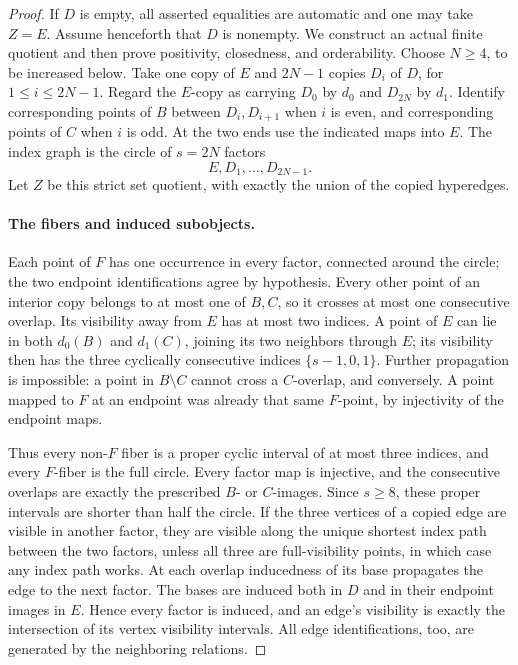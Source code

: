 \begin{proof}
If $D$ is empty, all asserted equalities are automatic and one
may take $Z=E$. Assume henceforth that $D$ is nonempty.
We construct an actual finite quotient and then prove positivity,
closedness, and orderability. Choose $N\geq4$, to be increased
below. Take one copy of $E$ and $2N-1$ copies $D_i$ of $D$,
for $1\leq i\leq2N-1$. Regard the $E$-copy as carrying $D_0$
by $d_0$ and $D_{2N}$ by $d_1$. Identify corresponding points
of $B$ between $D_i,D_{i+1}$ when $i$ is even, and corresponding
points of $C$ when $i$ is odd. At the two ends use the indicated
maps into $E$. The index graph is the circle of $s=2N$ factors
\[
 E,D_1,\ldots,D_{2N-1}.
\]
Let $Z$ be this strict set quotient, with exactly the union of the
copied hyperedges.

\paragraph{The fibers and induced subobjects.}
Each point of $F$ has one occurrence in every factor, connected
around the circle; the two endpoint identifications agree by
hypothesis. Every other point of an interior copy belongs to at
most one of $B,C$, so it crosses at most one consecutive overlap.
Its visibility away from $E$ has at most two indices. A point of
$E$ can lie in both $d_0(B)$ and $d_1(C)$, joining its two
neighbors through $E$; its visibility then has the three cyclically
consecutive indices $\{s-1,0,1\}$. Further propagation is impossible:
a point in $B\setminus C$ cannot cross a $C$-overlap, and conversely.
A point mapped to $F$ at an endpoint was already that same
$F$-point, by injectivity of the endpoint maps.

Thus every non-$F$ fiber is a proper cyclic interval of at most
three indices, and every $F$-fiber is the full circle. Every factor
map is injective, and the consecutive overlaps are exactly the
prescribed $B$- or $C$-images. Since $s\geq8$, these proper
intervals are shorter than half the circle. If the three vertices
of a copied edge are visible in another factor, they are visible
along the unique shortest index path between the two factors,
unless all three are full-visibility points, in which case any
index path works. At each overlap inducedness of its base
propagates the edge to the next factor. The bases are induced
both in $D$ and in their endpoint images in $E$. Hence every
factor is induced, and an edge's visibility is exactly the
intersection of its vertex visibility intervals. All edge
identifications, too, are generated by the neighboring relations.


\end{proof}
